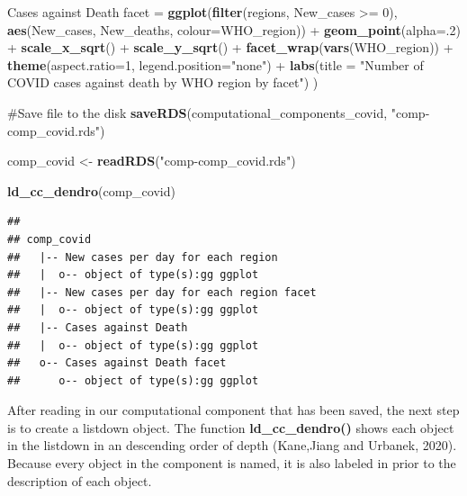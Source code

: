 \documentclass[
]{article}
\newenvironment{Shaded}{\begin{snugshade}}{\end{snugshade}}
\newcommand{\CommentTok}[1]{\textcolor[rgb]{0.54,0.53,0.53}{#1}}
\newcommand{\DataTypeTok}[1]{\textcolor[rgb]{0.00,0.34,0.68}{#1}}
\newcommand{\DecValTok}[1]{\textcolor[rgb]{0.69,0.50,0.00}{#1}}
\newcommand{\KeywordTok}[1]{\textcolor[rgb]{0.12,0.11,0.11}{\textbf{#1}}}
\newcommand{\NormalTok}[1]{\textcolor[rgb]{0.12,0.11,0.11}{#1}}
\newcommand{\OperatorTok}[1]{\textcolor[rgb]{0.12,0.11,0.11}{#1}}
\newcommand{\StringTok}[1]{\textcolor[rgb]{0.75,0.01,0.01}{#1}}
\begin{document}
\begin{Shaded}
\begin{Highlighting}[]
\StringTok{\textasciigrave{}}\DataTypeTok{Cases against Death facet}\StringTok{\textasciigrave{}}\NormalTok{ =}\StringTok{ }\KeywordTok{ggplot}\NormalTok{(}\KeywordTok{filter}\NormalTok{(regions, New\_cases }\OperatorTok{\textgreater{}=}\StringTok{ }\DecValTok{0}\NormalTok{),}
    \KeywordTok{aes}\NormalTok{(New\_cases, New\_deaths, }\DataTypeTok{colour=}\NormalTok{WHO\_region)) }\OperatorTok{+}\StringTok{ }
\StringTok{    }\KeywordTok{geom\_point}\NormalTok{(}\DataTypeTok{alpha=}\NormalTok{.}\DecValTok{2}\NormalTok{) }\OperatorTok{+}
\StringTok{    }\KeywordTok{scale\_x\_sqrt}\NormalTok{() }\OperatorTok{+}\StringTok{ }\KeywordTok{scale\_y\_sqrt}\NormalTok{() }\OperatorTok{+}
\StringTok{    }\KeywordTok{facet\_wrap}\NormalTok{(}\KeywordTok{vars}\NormalTok{(WHO\_region)) }\OperatorTok{+}
\StringTok{    }\KeywordTok{theme}\NormalTok{(}\DataTypeTok{aspect.ratio=}\DecValTok{1}\NormalTok{, }\DataTypeTok{legend.position=}\StringTok{"none"}\NormalTok{) }\OperatorTok{+}
\StringTok{    }\KeywordTok{labs}\NormalTok{(}\DataTypeTok{title =} \StringTok{"Number of COVID cases against death by WHO region by facet"}\NormalTok{)}
\NormalTok{)}

\CommentTok{\#Save file to the disk}
\KeywordTok{saveRDS}\NormalTok{(computational\_components\_covid, }\StringTok{"comp{-}comp\_covid.rds"}\NormalTok{)}
 
\NormalTok{comp\_covid \textless{}{-}}\StringTok{ }\KeywordTok{readRDS}\NormalTok{(}\StringTok{"comp{-}comp\_covid.rds"}\NormalTok{)}

\KeywordTok{ld\_cc\_dendro}\NormalTok{(comp\_covid)}
\end{Highlighting}
\end{Shaded}

\begin{verbatim}
## 
## comp_covid
##   |-- New cases per day for each region
##   |  o-- object of type(s):gg ggplot
##   |-- New cases per day for each region facet
##   |  o-- object of type(s):gg ggplot
##   |-- Cases against Death
##   |  o-- object of type(s):gg ggplot
##   o-- Cases against Death facet
##      o-- object of type(s):gg ggplot
\end{verbatim}

After reading in our computational component that has been saved, the
next step is to create a listdown object. The function
\textbf{ld\_cc\_dendro()} shows each object in the listdown in an
descending order of depth (Kane,Jiang and Urbanek, 2020). Because every
object in the component is named, it is also labeled in prior to the
description of each object.
\end{document}
